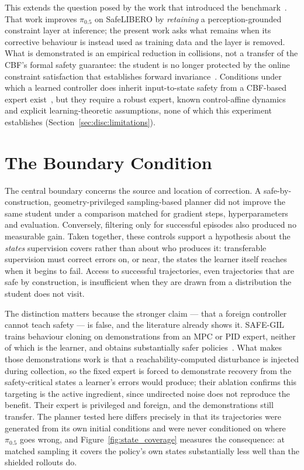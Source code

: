 \documentclass[a4paper,11pt]{report}
\begin{document}
This extends the question posed by the work that introduced the benchmark~\cite{vlsa2026}. That
work improves $\pi_{0.5}$ on SafeLIBERO by \emph{retaining} a perception-grounded constraint layer
at inference; the present work asks what remains when its corrective behaviour is instead used as
training data and the layer is removed. What is demonstrated is an empirical reduction in
collisions, not a transfer of the CBF's formal safety guarantee: the student is no longer protected
by the online constraint satisfaction that establishes forward invariance~\cite{ames2017cbf}.
Conditions under which a learned controller does inherit input-to-state safety from a CBF-based
expert exist~\cite{cosner2022il_cbf}, but they require a robust expert, known control-affine
dynamics and explicit learning-theoretic assumptions, none of which this experiment establishes
(Section~\ref{sec:disc:limitations}).

\section*{The Boundary Condition}

The central boundary concerns the source and location of correction. A safe-by-construction,
geometry-privileged sampling-based planner did not improve the same student under a comparison
matched for gradient steps, hyperparameters and evaluation. Conversely, filtering only for
successful episodes also produced no measurable gain. Taken together, these controls support a
hypothesis about the \emph{states} supervision covers rather than about who produces it:
transferable supervision must correct errors on, or near, the states the learner itself reaches
when it begins to fail. Access to successful trajectories, even trajectories that are safe by
construction, is insufficient when they are drawn from a distribution the student does not visit.

The distinction matters because the stronger claim --- that a foreign controller cannot teach
safety --- is false, and the literature already shows it. SAFE-GIL trains behaviour cloning on
demonstrations from an MPC or PID expert, neither of which is the learner, and obtains
substantially safer policies~\cite{ciftci2025safegil}. What makes those demonstrations work is that
a reachability-computed disturbance is injected during collection, so the fixed expert is forced to
demonstrate recovery from the safety-critical states a learner's errors would produce; their
ablation confirms this targeting is the active ingredient, since undirected noise does not
reproduce the benefit. Their expert is privileged and foreign, and the demonstrations still
transfer. The planner tested here differs precisely in that its trajectories were generated from
its own initial conditions and were never conditioned on where $\pi_{0.5}$ goes wrong, and
Figure~\ref{fig:state_coverage} measures the consequence: at matched sampling it covers the
policy's own states substantially less well than the shielded rollouts do.
\end{document}
